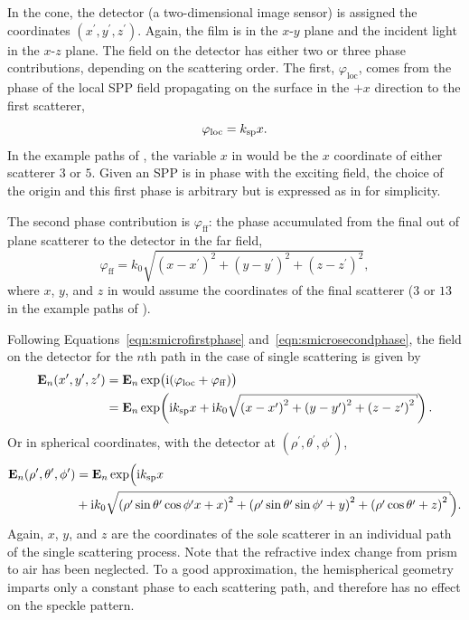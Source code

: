 In the cone, the detector (a two-dimensional image sensor) is assigned the
coordinates $(x^\prime,y^\prime,z^\prime)$.  Again, the film is in the
$x$-$y$ plane and the incident light in the $x$-$z$ plane.
The field on the detector has either two or three phase contributions,
depending on the scattering order. The first, $\varphi_\mathrm{loc}$, comes
from the phase of the local SPP field propagating on the surface in the
${+}x$ direction to the first scatterer,
\begin{equation}
\varphi_\mathrm{loc} = k_\mathrm{sp} x.
\label{eqn:smicrofirstphase}
\end{equation}
In the example paths of , the variable $x$ in
 would be the $x$
coordinate of either scatterer $3$ or $5$.  Given an SPP is in phase with the
exciting field, the choice of the origin and this first phase is arbitrary
but is expressed as in  for simplicity.

The second phase contribution is $\varphi_\mathrm{ff}$: the phase accumulated
from the final out of plane scatterer to the detector in the far field,
\begin{equation}
\varphi_\mathrm{ff} =
k_0\sqrt{{(x-x^\prime)}^2+{(y-y^\prime)}^2+{(z-z^\prime)}^2},
\label{eqn:smicrosecondphase}
\end{equation}
where $x$, $y$, and $z$ in  would assume the coordinates of the final scatterer
($3$ or $13$ in the example paths of ).

Following Equations~\ref{eqn:smicrofirstphase} and~\ref{eqn:smicrosecondphase},
the field on the detector for the $n$th path in the case of single scattering is given by
\begin{align}
\mathbf{E}_n(x^\prime,y^\prime,z^\prime) &=
\mathbf{E}_n\exp\bigl(\mi(\varphi_\mathrm{loc}+\varphi_\mathrm{ff})\bigr)\\
&= \mathbf{E}_n\exp\!\left(\mi\ksp x + %
\mi k_0\sqrt{{(x-x^\prime)}^2+{(y-y^\prime)}^2+{(z-z^\prime)}^2}\right).
\label{eqn:smicrosinglescattering}
\end{align}
Or in spherical coordinates, with the detector at
$(\rho^\prime,\theta^\prime,\phi^\prime)$,
\begin{align}
				\mathbf{E}_n(\rho^\prime,\theta^\prime,\phi^\prime) &= \mathbf{E}_n\exp\Bigl(\mi\ksp x \\
&+ \mi k_0\sqrt{{(\rho^\prime\sin\theta^\prime\cos\phi^\prime
x+x)}^2+{(\rho^\prime\sin\theta^\prime\sin\phi^\prime+y)}^2+{(\rho^\prime\cos\theta^\prime+z)}^2
} \Bigr).
\label{eqn:scattspherical}
\end{align}
Again, $x$, $y$, and $z$ are the coordinates of the sole scatterer in an
individual path of the single scattering process.  Note that the
refractive index change from prism to air has been neglected.  To a good
approximation, the hemispherical geometry imparts only a constant phase to
each scattering path, and therefore has no effect on the speckle pattern.

